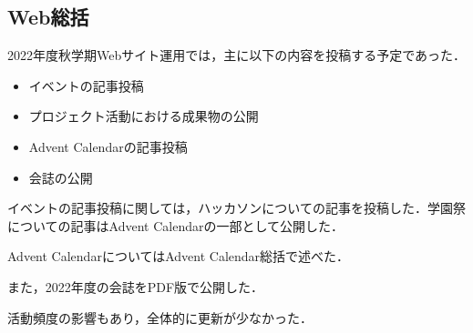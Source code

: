 \subsection*{Web総括}


2022年度秋学期Webサイト運用では，主に以下の内容を投稿する予定であった．

\begin{itemize}
  \item イベントの記事投稿
  \item プロジェクト活動における成果物の公開
  \item Advent Calendarの記事投稿
  \item 会誌の公開
\end{itemize}

イベントの記事投稿に関しては，ハッカソンについての記事を投稿した．学園祭についての記事はAdvent Calendarの一部として公開した．

Advent CalendarについてはAdvent Calendar総括で述べた．

また，2022年度の会誌をPDF版で公開した．

活動頻度の影響もあり，全体的に更新が少なかった．
